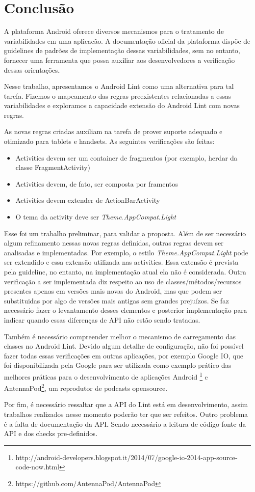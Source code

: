 \chapter{Conclusão}
\label{conclusao}
A plataforma Android oferece diversos mecanismos para o tratamento de variabilidades
em uma aplicacão. A documentação oficial da plataforma dispõe de guidelines de 
padrões de implementação dessas variabilidades, sem no entanto, fornecer uma ferramenta
que possa auxiliar aos desenvolvedores a verificação dessas orientações.

Nesse trabalho, apresentamos o Android Lint como uma alternativa para tal tarefa.
Fizemos o mapeamento das regras preexistentes relacionadas a essas variabilidades
e exploramos a capacidade extensão do Android Lint com novas regras. 

As novas regras criadas auxiliam na tarefa de prover suporte adequado e otimizado
para tablets e handsets. As seguintes verificações são feitas:
\begin{itemize}
  \item{Activities devem ser um container de fragmentos (por exemplo, herdar da
  classe FragmentActivity)}
  \item{Activities devem, de fato, ser composta por framentos}
  \item{Activities devem extender de ActionBarActivity}
  \item{O tema da activity deve ser {\it Theme.AppCompat.Light}}
\end{itemize}

Esse foi um trabalho preliminar, para validar a proposta. Além de ser necessário
algum refinamento nessas novas regras definidas, outras regras devem ser analisadas
e implementadas. Por exemplo, o estilo {\it Theme.AppCompat.Light} pode ser extendido
e essa extensão utilizada nas activities. Essa extensão é prevista pela guideline,
no entanto, na implementação atual ela não é considerada. Outra verificação a ser
implementada diz respeito ao uso de classes/métodos/recursos presentes apenas em
versões mais novas do Android, mas que podem ser substituidas por algo de versões
mais antigas sem grandes prejuízos. Se faz necessário fazer o levantamento desses
elementos e posterior implementação para indicar quando essas diferenças de API
não estão sendo tratadas.

Também é necessário compreender melhor o mecanismo de carregamento das classes no
Android Lint. Devido algum detalhe de configuração, não foi possível fazer todas
essas verificações em outras aplicações, por exemplo Google IO, que foi disponibilizada
pela Google para ser utilizada como exemplo prático das melhores práticas para o
desenvolvimento de aplicações Android
\footnote{http://android-developers.blogspot.it/2014/07/google-io-2014-app-source-code-now.html}
e AntennaPod\footnote{https://github.com/AntennaPod/AntennaPod}, um reprodutor de
podcasts opensource.

Por fim, é necessário ressaltar que a API do Lint está em desenvolvimento, assim
trabalhos realizados nesse momento poderão ter que ser refeitos. Outro problema é
a falta de documentação da API. Sendo necessário a leitura de código-fonte da API
e dos checks pre-definidos. 

